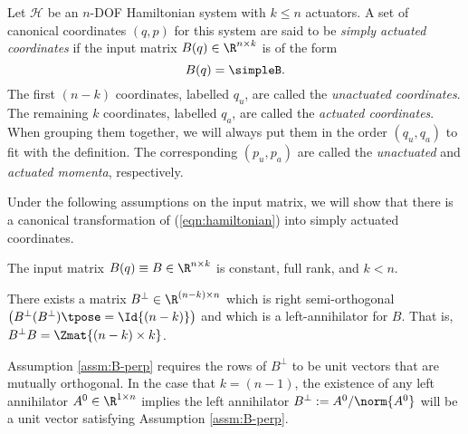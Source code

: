 \begin{defn}
    Let \(\mathcal{H}\) be an \(n\)-DOF Hamiltonian system 
    with \(k \leq n\) actuators. 
    A set of canonical coordinates \((q,p)\) for this system
    are said to be \textit{simply actuated coordinates} if the
    input matrix \(B(q) \in \R^{n \times k}\) is of the form
    \[
        B(q) = \simpleB    
        .
    \]
    The first \((n-k)\) coordinates, labelled \(q_u\), are called the
    \textit{unactuated coordinates}. The remaining \(k\) coordinates, labelled
    \(q_a\), are called the \textit{actuated coordinates}. When grouping them
    together, we will always put them in the order \((q_u, q_a)\) to fit with 
    the definition. 
    The corresponding \((p_u, p_a)\) are called the \textit{unactuated} and 
    \textit{actuated momenta}, respectively.
\end{defn}

Under the following assumptions on the input matrix, we will show that there is
a canonical transformation of (\ref{eqn:hamiltonian}) into simply actuated
coordinates.

\begin{assm}\label{assm:B-const}
    The input matrix \(B(q) \equiv B \in \R^{n\times k}\) is constant,
    full rank, and \(k < n\).
\end{assm}
\begin{assm}\label{assm:B-perp}
    There exists a matrix 
    \(B^\perp \in \R^{(n-k)\times n}\)
    which is right semi-orthogonal 
    \(\left(B^\perp(B^\perp)\tpose = \Id{(n-k)}\right)\)
    and which is a left-annihilator for \(B\). 
    That is, \(B^\perp B = \Zmat{(n-k) \times k}\).
\end{assm}

Assumption \ref{assm:B-perp} requires the rows of \(B^\perp\) to be unit vectors
that are mutually orthogonal. 
In the case that \(k = (n-1)\), the existence of any left annihilator 
\(A^0 \in \R^{1\times n}\) implies the left annihilator 
\(B^\perp := A^0/\norm{A^0}\) will be a unit vector satisfying Assumption \ref{assm:B-perp}.

